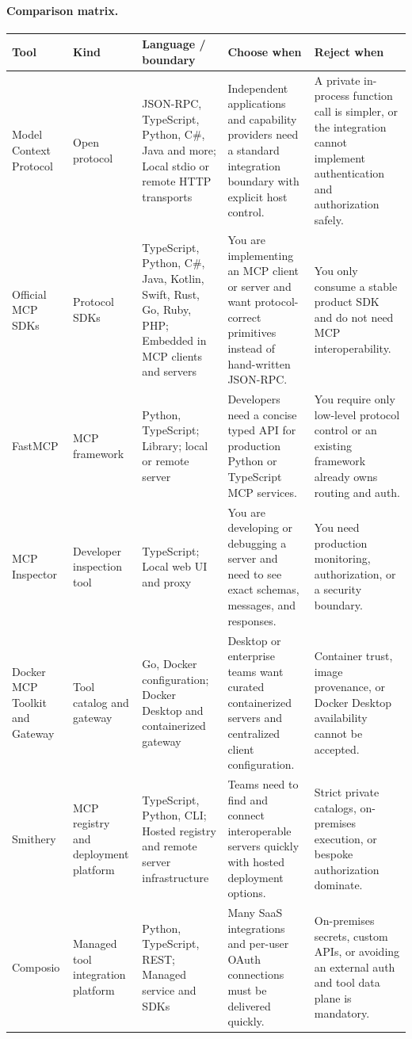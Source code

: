 \paragraph{Comparison matrix.}
\begin{longtable}{@{}p{20mm}p{22mm}p{26mm}p{46mm}p{46mm}@{}}
\toprule\textbf{Tool} & \textbf{Kind} & \textbf{Language / boundary} & \textbf{Choose when} & \textbf{Reject when}\\\midrule\endhead
Model Context Protocol & Open protocol & JSON-RPC, TypeScript, Python, C\#, Java and more; Local stdio or remote HTTP transports & Independent applications and capability providers need a standard integration boundary with explicit host control. & A private in-process function call is simpler, or the integration cannot implement authentication and authorization safely.\\
Official MCP SDKs & Protocol SDKs & TypeScript, Python, C\#, Java, Kotlin, Swift, Rust, Go, Ruby, PHP; Embedded in MCP clients and servers & You are implementing an MCP client or server and want protocol-correct primitives instead of hand-written JSON-RPC. & You only consume a stable product SDK and do not need MCP interoperability.\\
FastMCP & MCP framework & Python, TypeScript; Library; local or remote server & Developers need a concise typed API for production Python or TypeScript MCP services. & You require only low-level protocol control or an existing framework already owns routing and auth.\\
MCP Inspector & Developer inspection tool & TypeScript; Local web UI and proxy & You are developing or debugging a server and need to see exact schemas, messages, and responses. & You need production monitoring, authorization, or a security boundary.\\
Docker MCP Toolkit and Gateway & Tool catalog and gateway & Go, Docker configuration; Docker Desktop and containerized gateway & Desktop or enterprise teams want curated containerized servers and centralized client configuration. & Container trust, image provenance, or Docker Desktop availability cannot be accepted.\\
Smithery & MCP registry and deployment platform & TypeScript, Python, CLI; Hosted registry and remote server infrastructure & Teams need to find and connect interoperable servers quickly with hosted deployment options. & Strict private catalogs, on-premises execution, or bespoke authorization dominate.\\
Composio & Managed tool integration platform & Python, TypeScript, REST; Managed service and SDKs & Many SaaS integrations and per-user OAuth connections must be delivered quickly. & On-premises secrets, custom APIs, or avoiding an external auth and tool data plane is mandatory.\\

\end{longtable}
